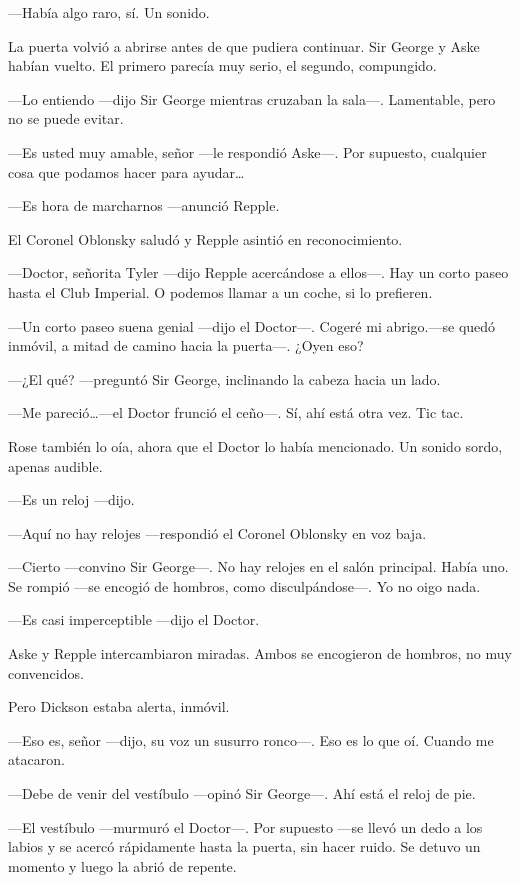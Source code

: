 {---Había algo raro, sí. Un sonido.}

{La puerta volvió a abrirse antes de que pudiera continuar. Sir George y
	Aske habían vuelto. El primero parecía muy serio, el segundo,
compungido.}

{---Lo entiendo ---dijo Sir George mientras cruzaban la sala---.
Lamentable, pero no se puede evitar.}

{---Es usted muy amable, señor ---le respondió Aske---. Por supuesto,
	cualquier cosa que podamos hacer para ayudar\ldots{}}

{---Es hora de marcharnos ---anunció Repple.}

{El Coronel Oblonsky saludó y Repple asintió en reconocimiento.}

{---Doctor, señorita Tyler ---dijo Repple acercándose a ellos---. Hay un
	corto paseo hasta el Club Imperial. O podemos llamar a un coche, si lo
prefieren.}

{---Un corto paseo suena genial ---dijo el Doctor---. Cogeré mi
	abrigo.---se quedó inmóvil, a mitad de camino hacia la puerta---. ¿Oyen
eso?}

{---¿El qué? ---preguntó Sir George, inclinando la cabeza hacia un
lado.}

{---Me pareció\ldots{}---el Doctor frunció el ceño---. Sí, ahí está otra
vez. Tic tac.}

{Rose también lo oía, ahora que el Doctor lo había mencionado. Un sonido
sordo, apenas audible.}

{---Es un reloj ---dijo.}

{---Aquí no hay relojes ---respondió el Coronel Oblonsky en voz baja.}

{---Cierto ---convino Sir George---. No hay relojes en el salón
	principal. Había uno. Se rompió ---se encogió de hombros, como
disculpándose---. Yo no oigo nada.}

{---Es casi imperceptible ---dijo el Doctor.}

{Aske y Repple intercambiaron miradas. Ambos se encogieron de hombros,
no muy convencidos.}

{Pero Dickson estaba alerta, inmóvil.}

{---Eso es, señor ---dijo, su voz un susurro ronco---. Eso es lo que oí.
Cuando me atacaron.}

{---Debe de venir del vestíbulo ---opinó Sir George---. Ahí está el
reloj de pie.}

{---El vestíbulo ---murmuró el Doctor---. Por supuesto ---se llevó un
	dedo a los labios y se acercó rápidamente hasta la puerta, sin hacer
ruido. Se detuvo un momento y luego la abrió de repente.}

